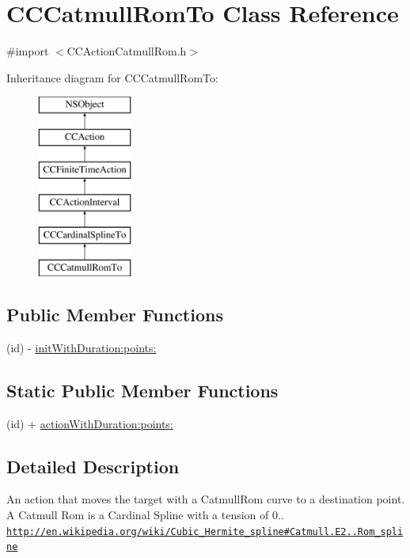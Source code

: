 \hypertarget{interface_c_c_catmull_rom_to}{\section{C\-C\-Catmull\-Rom\-To Class Reference}
\label{interface_c_c_catmull_rom_to}
}


{\ttfamily \#import $<$C\-C\-Action\-Catmull\-Rom.\-h$>$}

Inheritance diagram for C\-C\-Catmull\-Rom\-To\-:\begin{figure}[H]
\begin{center}
\leavevmode
\includegraphics[height=6.000000cm]{interface_c_c_catmull_rom_to}
\end{center}
\end{figure}
\subsection*{Public Member Functions}
\begin{DoxyCompactItemize}
\item 
(id) -\/ \hyperlink{interface_c_c_catmull_rom_to_a4fe8a81d1d1d96f45001ffc59827a71c}{init\-With\-Duration\-:points\-:}
\end{DoxyCompactItemize}
\subsection*{Static Public Member Functions}
\begin{DoxyCompactItemize}
\item 
(id) + \hyperlink{interface_c_c_catmull_rom_to_ab107d7117fa2131a0574f97efa617949}{action\-With\-Duration\-:points\-:}
\end{DoxyCompactItemize}


\subsection{Detailed Description}
An action that moves the target with a Catmull\-Rom curve to a destination point. A Catmull Rom is a Cardinal Spline with a tension of 0.. \href{http://en.wikipedia.org/wiki/Cubic_Hermite_spline#Catmull.E2.80.93Rom_spline}{\tt http\-://en.\-wikipedia.\-org/wiki/\-Cubic\-\_\-\-Hermite\-\_\-spline\#\-Catmull.\-E2..\-Rom\-\_\-spline} 

